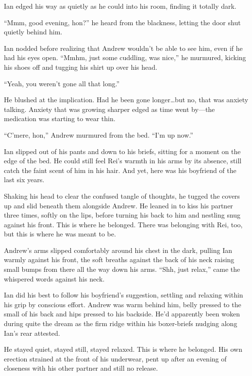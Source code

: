 \secdiv{}

Ian edged his way as quietly as he could into his room, finding it totally dark.

``Mmm, good evening, hon?'' he heard from the blackness, letting the door shut quietly behind him.

Ian nodded before realizing that Andrew wouldn't be able to see him, even if he had his eyes open. ``Mmhm, just some cuddling, was nice,'' he murmured, kicking his shoes off and tugging his shirt up over his head.

``Yeah, you weren't gone all that long.''

He blushed at the implication. Had he been gone longer\ldots{}but no, that was anxiety talking. Anxiety that was growing sharper edged as time went by---the medication was starting to wear thin.

``C'mere, hon,'' Andrew murmured from the bed. ``I'm up now.''

Ian slipped out of his pants and down to his briefs, sitting for a moment on the edge of the bed. He could still feel Rei's warmth in his arms by its absence, still catch the faint scent of him in his hair. And yet, here was his boyfriend of the last six years.

Shaking his head to clear the confused tangle of thoughts, he tugged the covers up and slid beneath them alongside Andrew. He leaned in to kiss his partner three times, softly on the lips, before turning his back to him and nestling snug against his front. This is where he belonged. There was belonging with Rei, too, but this is where he was meant to be.

Andrew's arms slipped comfortably around his chest in the dark, pulling Ian warmly against his front, the soft breaths against the back of his neck raising small bumps from there all the way down his arms. ``Shh, just relax,'' came the whispered words against his neck.

Ian did his best to follow his boyfriend's suggestion, settling and relaxing within his grip by conscious effort. Andrew was warm behind him, belly pressed to the small of his back and hips pressed to his backside. He'd apparently been woken during quite the dream as the firm ridge within his boxer-briefs nudging along Ian's rear attested.

He stayed quiet, stayed still, stayed relaxed. This is where he belonged. His own erection strained at the front of his underwear, pent up after an evening of closeness with his other partner and still no release.

